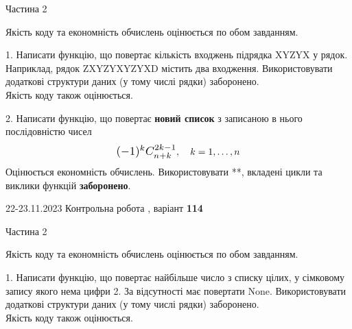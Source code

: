 \documentclass[12pt, ukrainian]{article}
\begin{document}
{{{{{{{{{{{{\begin {Huge}
\begin{center}Частина 2
\end{center}
\vspace{10mm}
\end {Huge}

{
\begin {Large}
Якість коду та економність обчислень оцінюється по обом завданням.

\vspace{5mm}

1. Написати функцію, що повертає кількість входжень підрядка XYZYX у рядок. Наприклад, рядок ZXYZYXYZYXD містить два входження. Використовувати додаткові структури даних (у тому числі рядки) заборонено.\\	Якість коду також оцінюється. 



\vspace{10mm}



2. 
Написати функцію, що повертає \textbf{новий список} з записаною в нього послідовністю чисел
$$\scalebox{1.2}{$(-1)^{k}C_{n+k}^{2k-1}$}, \quad k=1,\ldots,n$$
Оцінюється економність обчислень. Використовувати **, вкладені цикли та виклики функцій \textbf{заборонено}.

\end{Large}\newpage




\begin {Huge}
{{22-23.11.2023 Контрольна робота , варіант  \No \textbf { 114 }\par}}

\begin{center}Частина 2
\end{center}
\vspace{10mm}
\end {Huge}

{
\begin {Large}
Якість коду та економність обчислень оцінюється по обом завданням.

\vspace{5mm}

1. Написати функцію, що повертає найбільше число з списку цілих, у сімковому запису якого нема цифри 2. За відсутності має повертати None. Використовувати додаткові структури даних (у тому числі рядки) заборонено.\\	Якість коду також оцінюється. 




\end{Large}}}}}}}}}}}}}}}
\end{document}
